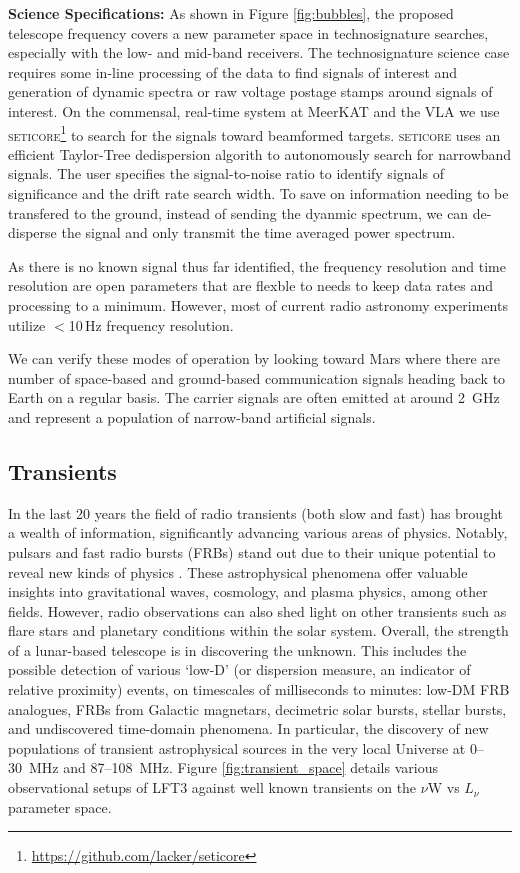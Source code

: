 \textbf{Science Specifications:} As shown in Figure \ref{fig:bubbles}, the proposed telescope frequency covers a new parameter space in technosignature searches, especially with the low- and mid-band receivers. The technosignature science case requires some in-line processing of the data to find signals of interest and generation of dynamic spectra or raw voltage postage stamps around signals of interest. On the commensal, real-time system at MeerKAT and the VLA \citep{Tremblay_2024} we use \textsc{seticore}\footnote{\url{https://github.com/lacker/seticore}} to search for the signals toward beamformed targets. \textsc{seticore} uses an efficient Taylor-Tree dedispersion algorith to autonomously search for narrowband signals. The user specifies the signal-to-noise ratio to identify signals of significance and the drift rate search width. To save on information needing to be transfered to the ground, instead of sending the dyanmic spectrum, we can de-disperse the signal and only transmit the time averaged power spectrum. 

As there is no known signal thus far identified, the frequency resolution and time resolution are open parameters that are flexble to needs to keep data rates and processing to a minimum. However, most of current radio astronomy experiments utilize $<$10\,Hz frequency resolution. 

We can verify these modes of operation by looking toward Mars where there are number of space-based and ground-based communication signals heading back to Earth on a regular basis. The carrier signals are often emitted at around 2~GHz and represent a population of narrow-band artificial signals.

\subsection{Transients}
In the last 20 years the field of radio transients (both slow and fast) has brought a wealth of information, significantly advancing various areas of physics. Notably, pulsars and fast radio bursts (FRBs) stand out due to their unique potential to reveal new kinds of physics \citep{beskin_radio_2015, ng_brief_2023}. These astrophysical phenomena offer valuable insights into gravitational waves, cosmology, and plasma physics, among other fields. However, radio observations can also shed light on other transients such as flare stars and planetary conditions within the solar system. Overall, the strength of a lunar-based telescope is in discovering the unknown. This includes the possible detection of various `low-D' (or dispersion measure, an indicator of relative proximity) events, on timescales of milliseconds to minutes: low-DM FRB analogues, FRBs from Galactic magnetars, decimetric solar bursts, stellar bursts, and undiscovered time-domain phenomena. In particular, the discovery of new populations of transient astrophysical sources in the very local Universe at 0--30~MHz and 87--108~MHz. Figure \ref{fig:transient_space} details various observational setups of LFT3 against well known transients on the $\nu \text{W}$ vs $L_\nu$ parameter space. 

